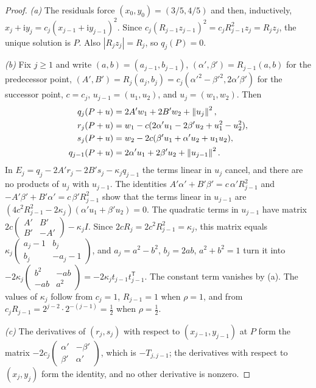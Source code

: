 \begin{proof}
\emph{(a)} The residuals force $(x_0,y_0)=(3/5,4/5)$ and then, inductively,
$x_j+\mathrm iy_j=c_j(x_{j-1}+\mathrm iy_{j-1})^2$. Since
$c_j(R_{j-1}z_{j-1})^2=c_jR_{j-1}^2z_j=R_jz_j$, the unique solution is $P$.
Also $|R_jz_j|=R_j$, so $q_j(P)=0$.

\emph{(b)} Fix $j\ge1$ and write $(a,b)=(a_{j-1},b_{j-1})$,
$(\alpha',\beta')=R_{j-1}(a,b)$ for the predecessor point,
$(A',B')=R_j(a_j,b_j)=c_j(\alpha'^2-\beta'^2,2\alpha'\beta')$ for the successor
point, $c=c_j$, $u_{j-1}=(u_1,u_2)$, and $u_j=(w_1,w_2)$. Then
\begin{align*}
 q_j(P+u)&=2A'w_1+2B'w_2+\left\lVert u_j\right\rVert^2,\\
 r_j(P+u)&=w_1-c(2\alpha'u_1-2\beta'u_2+u_1^2-u_2^2),\\
 s_j(P+u)&=w_2-2c(\beta'u_1+\alpha'u_2+u_1u_2),\\
 q_{j-1}(P+u)&=2\alpha'u_1+2\beta'u_2+\left\lVert u_{j-1}\right\rVert^2 .
\end{align*}
In $E_j=q_j-2A'r_j-2B's_j-\kappa_jq_{j-1}$ the terms linear in $u_j$ cancel,
and there are no products of $u_j$ with $u_{j-1}$. The identities
$A'\alpha'+B'\beta'=c\,\alpha'R_{j-1}^2$ and
$-A'\beta'+B'\alpha'=c\,\beta'R_{j-1}^2$ show that the terms linear in
$u_{j-1}$ are $(4c^2R_{j-1}^2-2\kappa_j)(\alpha'u_1+\beta'u_2)=0$. The
quadratic terms in $u_{j-1}$ have matrix
$2c\left(\begin{smallmatrix}A'&B'\\B'&-A'\end{smallmatrix}\right)-\kappa_jI$.
Since $2cR_j=2c^2R_{j-1}^2=\kappa_j$, this matrix equals
$\kappa_j\left(\begin{smallmatrix}a_j-1&b_j\\b_j&-a_j-1\end{smallmatrix}\right)$,
and $a_j=a^2-b^2$, $b_j=2ab$, $a^2+b^2=1$ turn it into
$-2\kappa_j\left(\begin{smallmatrix}b^2&-ab\\-ab&a^2\end{smallmatrix}\right)
=-2\kappa_jt_{j-1}t_{j-1}^{\mathsf T}$. The constant term vanishes by (a). The
values of $\kappa_j$ follow from $c_j=1$, $R_{j-1}=1$ when $\rho=1$, and from
$c_jR_{j-1}=2^{j-2}\cdot2^{-(j-1)}=\frac12$ when $\rho=\frac12$.

\emph{(c)} The derivatives of $(r_j,s_j)$ with respect to $(x_{j-1},y_{j-1})$
at $P$ form the matrix
$-2c_j\left(\begin{smallmatrix}\alpha'&-\beta'\\\beta'&\alpha'\end{smallmatrix}
\right)$, which is $-T_{j,j-1}$; the derivatives with respect to $(x_j,y_j)$
form the identity, and no other derivative is nonzero.
\end{proof}

